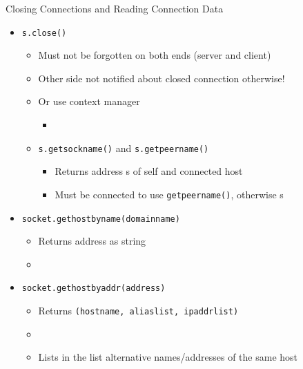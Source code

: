 \begin{frame}{Closing Connections and Reading Connection Data}
%
\begin{itemize}
\item \texttt{s.close()}
	\begin{itemize}
	\item Must not be forgotten on both ends (server and client)
	\item Other side not notified about closed connection otherwise!
	\item Or use context manager
	\begin{itemize}
	\item {}
		\end{itemize}
	\end{itemize}
\pause
\begin{itemize}
\item \texttt{s.getsockname()} and \texttt{s.getpeername()}
	\begin{itemize}
	\item Returns address s of self and connected host
	\item Must be connected to use \texttt{getpeername()}, otherwise s 
	\end{itemize}
\end{itemize}
\pause
\item \texttt{socket.gethostbyname(domainname)}
	\begin{itemize}
	\item Returns address as string
	\item {} \thus {}
	\end{itemize}
\item \texttt{socket.gethostbyaddr(address)}
	\begin{itemize}
	\item Returns \texttt{(hostname, aliaslist, ipaddrlist)}
	\item {} \thus {}
	\item Lists in the   list alternative names/addresses of the same host
	\end{itemize}
\end{itemize}
%
\end{frame}


